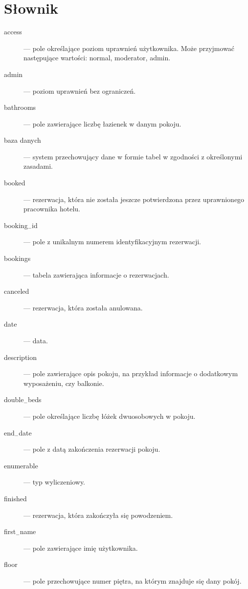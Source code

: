 \documentclass [11pt, a4paper, leqno] {article}
\begin{document}
\section{Słownik}
\begin{description}
\item[access] --- pole określające poziom uprawnień użytkownika. Może przyjmować następujące wartości: normal, moderator, admin.

\item[admin] --- poziom uprawnień bez ograniczeń.

\item[bathrooms] --- pole zawierające liczbę łazienek w danym pokoju.

\item[baza danych] --- system przechowujący dane w formie tabel w zgodności z określonymi zasadami. 

\item[booked] --- rezerwacja, która nie została jeszcze potwierdzona przez uprawnionego pracownika hotelu.

\item[booking$_{-}$id] --- pole z unikalnym numerem identyfikacyjnym rezerwacji.

\item[bookings] --- tabela zawierająca informacje o rezerwacjach.

\item[canceled] --- rezerwacja, która została anulowana.

\item[date] --- data.

\item[description] --- pole zawierające opis pokoju, na przykład informacje o dodatkowym wyposażeniu, czy balkonie.

\item[double$_{-}$beds] --- pole określające liczbę łóżek dwuosobowych w pokoju.

\item[end$_{-}$date] --- pole z datą zakończenia rezerwacji pokoju.

\item[enumerable] --- typ wyliczeniowy.

\item[finished] --- rezerwacja, która zakończyła się powodzeniem.

\item[first$_{-}$name] --- pole zawierające imię użytkownika.

\item[floor] --- pole przechowujące numer piętra, na którym znajduje się dany pokój.


\end{description}
\end{document}
